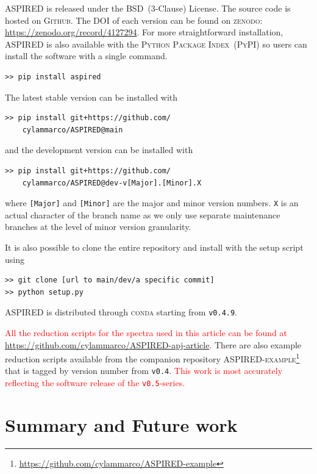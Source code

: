 \documentclass[linenumbers, twocolumn]{aastex631}
\begin{document}
\textsc{ASPIRED} is released under the BSD~(3-Clause) License. The source code
is hosted on \textsc{Github}. The DOI of each version can be found on 
\textsc{zenodo}: \url{https://zenodo.org/record/4127294}. For more
straightforward installation, \textsc{ASPIRED} is also available with the
\textsc{Python Package Index}~(\textsc{PyPI}) so users can install the software with a single command. 
\begin{verbatim}
>> pip install aspired
\end{verbatim}
The latest stable version can be installed with
\begin{verbatim}
>> pip install git+https://github.com/
    cylammarco/ASPIRED@main
\end{verbatim}
and the development version can be installed with 
\begin{verbatim}
>> pip install git+https://github.com/
    cylammarco/ASPIRED@dev-v[Major].[Minor].X
\end{verbatim} where \verb+[Major]+ and \verb+[Minor]+ are the major and minor
version numbers. \verb+X+ is an actual character of the branch name as we only
use separate maintenance branches at the level of minor version granularity.

It is also possible to clone the entire repository
and install with the setup script using
\begin{verbatim}
>> git clone [url to main/dev/a specific commit]
>> python setup.py
\end{verbatim}
ASPIRED is distributed through \textsc{conda} starting from \texttt{v0.4.9}.

\textcolor{red}{
All the reduction scripts for the spectra used in this article can be found at
\url{https://github.com/cylammarco/ASPIRED-apj-article}.
}There are also example reduction scripts available from the companion repository
\textsc{ASPIRED-example}\footnote{\url{https://github.com/cylammarco/ASPIRED-example}}
that is tagged by version number from \texttt{v0.4}. \textcolor{red}{This work is most accurately
reflecting the software release of the \texttt{v0.5}-series.}


\section{Summary and Future work}
\label{sec:summary}
\end{document}
